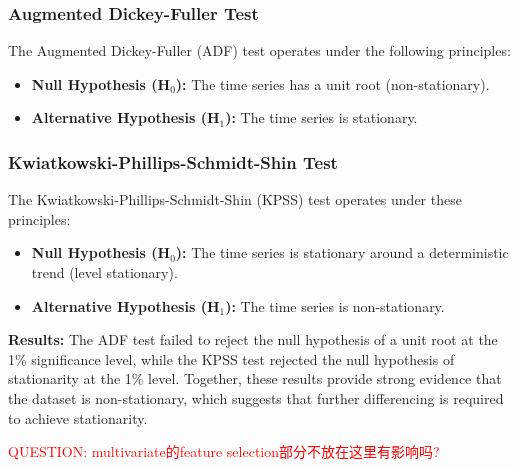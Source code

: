 \subsubsection{Augmented Dickey-Fuller Test}
The Augmented Dickey-Fuller (ADF) test operates under the following principles:
\begin{itemize}
    \item \textbf{Null Hypothesis (H\(_0\)):} The time series has a unit root (non-stationary).
    \item \textbf{Alternative Hypothesis (H\(_1\)):} The time series is stationary.
\end{itemize}


\subsubsection{Kwiatkowski-Phillips-Schmidt-Shin Test}
The Kwiatkowski-Phillips-Schmidt-Shin (KPSS) test operates under these principles:
\begin{itemize}
    \item \textbf{Null Hypothesis (H\(_0\)):} The time series is stationary around a deterministic trend (level stationary).
    \item \textbf{Alternative Hypothesis (H\(_1\)):} The time series is non-stationary.
\end{itemize}

\textbf{Results:} The ADF test failed to reject the null hypothesis of a unit root at the 1\% significance level, while the KPSS test rejected the null hypothesis of stationarity at the 1\% level. Together, these results provide strong evidence that the dataset is non-stationary, which suggests that further differencing is required to achieve stationarity.

\textcolor{red}{QUESTION: multivariate的feature selection部分不放在这里有影响吗?}
